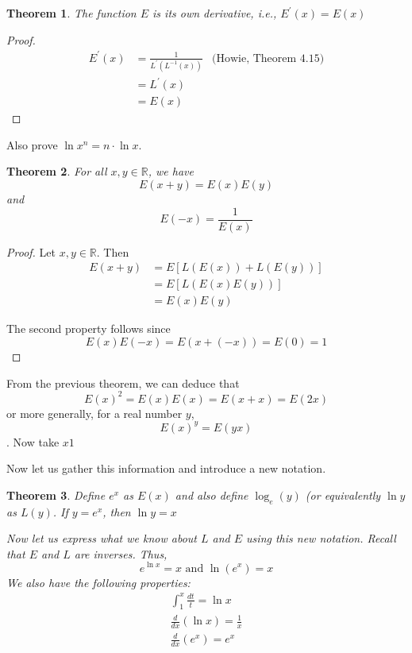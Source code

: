 \documentclass[12pt]{article}
\theoremstyle{mystyle}
\newtheorem{thm}{Theorem}
\newcommand{\R}{\mathbb{R}}
\begin{document}
\begin{thm}
  The function $E$ is its own derivative, i.e., $E^\prime(x) = E(x)$
\end{thm}
\begin{proof}
  \begin{align*}
    E^\prime(x) 
        &= \frac{1}{L^\prime(L^{-1}(x))}  & \text{(Howie, Theorem 4.15)} \\
        &= L^\prime(x) \\
        &= E(x)
  \end{align*}
\end{proof}


Also prove $\ln x^n = n \cdot \ln x$.

\begin{thm}
  For all $x,y \in \R$, we have
  $$ E(x+y) = E(x)E(y) $$
  and
  $$ E(-x) = \frac{1}{E(x)}$$
\end{thm}
\begin{proof}
  Let $x,y \in \R$. Then
  \begin{align*}
    E(x+y) &= E[L(E(x)) + L(E(y))] \\
           &= E[L(E(x)E(y))] \\
           &= E(x)E(y)
  \end{align*}
  
  The second property follows since
  $$ E(x)E(-x) = E(x +(-x)) = E(0) = 1 $$
\end{proof}



From the previous theorem, we can deduce that
  $$E(x)^2 = E(x)E(x) = E(x+x) = E(2x)$$
  or more generally, for a real number $y$,
  $$ E(x)^y = E(yx)$$.
  Now take $x  1$

Now let us gather this information and introduce a new notation.

\begin{thm}
  Define $e^x$ as $E(x)$ and also define $\log_e (y)$ (or equivalently $\ln y$
  as $L(y)$. If $y = e^x$, then $\ln y = x$
  
  Now let us express what we know about $L$ and $E$ using this new notation.
  Recall that $E$ and $L$ are inverses. Thus,
  $$ e^{\ln x} = x \text{ and } \ln(e^x) = x $$
  We also have the following properties:
  \begin{align*}
    \int_{1}^x \frac{dt}{t} = \ln x \\
    \frac{d}{dx}(\ln x) = \frac{1}{x} \\
    \frac{d}{dx}(e^x) = e^x \\
  \end{align*}
    
\end{thm}
\end{document}
